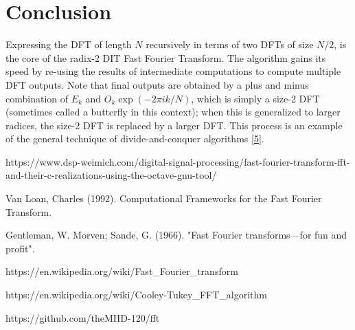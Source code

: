 \documentclass[12pt,a4paper]{article}
\begin{document}
\section{Conclusion}\label{sec3}
\hspace{0.5cm} Expressing the DFT of length $N$ recursively in terms of two DFTs of size $N/2$, is the core of the radix-2 DIT Fast Fourier Transform. The algorithm gains its speed by re-using the results of intermediate computations to compute multiple DFT outputs. Note that final outputs are obtained by a plus and minus combination of $E_{k}$ and $O_{k}\exp(-2\pi ik/N)$, which is simply a size-2 DFT (sometimes called a butterfly in this context); when this is generalized to larger radices, the size-2 DFT is replaced by a larger DFT. This process is an example of the general technique of divide-and-conquer algorithms [\href{https://en.wikipedia.org/wiki/Cooley%E2%80%93Tukey_FFT_algorithm}{5}].

\begin{thebibliography}{9}
https://www.dsp-weimich.com/digital-signal-processing/fast-fourier-transform-fft-and-their-c-realizations-using-the-octave-gnu-tool/

Van Loan, Charles (1992). Computational Frameworks for the Fast Fourier Transform.

Gentleman, W. Morven; Sande, G. (1966). "Fast Fourier transforms—for fun and profit".

https://en.wikipedia.org/wiki/Fast\_Fourier\_transform

https://en.wikipedia.org/wiki/Cooley-Tukey\_FFT\_algorithm

https://github.com/theMHD-120/fft
\end{thebibliography}
\end{document}
